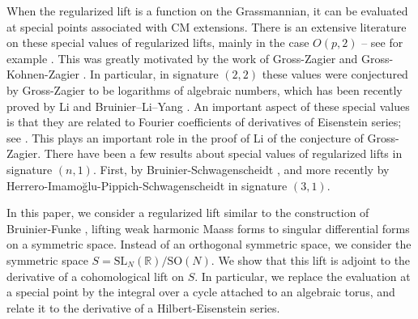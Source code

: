 \documentclass[twoside,a4paper,10pt]{article} %
\newcommand{\8}{\infty}
\newcommand{\SO}{\mathrm{SO}}
\newcommand{\SL}{\mathrm{SL}}
\newcommand{\R}{\mathbb{R}}
\theoremstyle{mytheoremstyle}
\theoremstyle{remark}
\numberwithin{equation}{section}
\begin{document}
When the regularized lift is a function on the Grassmannian, it can be evaluated at special points associated with CM extensions. There is an extensive literature on these special values of regularized lifts, mainly in the case $O(p,2)$ -- see for example \cite{Schofer,V15,BKY,BY09,BEY,E17,Li22,Li23,BLY25}. This was greatly motivated by the work of Gross-Zagier \cite{gz86} and Gross-Kohnen-Zagier \cite{GKZ87}. In particular, in signature $(2,2)$ these values were conjectured by Gross-Zagier to be logarithms of algebraic numbers, which has been recently proved by Li \cite{Li23} and Bruinier–Li–Yang \cite{BLY25}. An important aspect of these special values is that they are related to Fourier coefficients of derivatives of Eisenstein series; see \cite{BKY,BY09,BEY}. This plays an important role in the proof of Li \cite{Li23} of the conjecture of Gross-Zagier. There have been a few results about special values of regularized lifts in signature $(n,1)$. First, by Bruinier-Schwagenscheidt \cite{BS21}, and more recently by Herrero-Imamo\u{g}lu-Pippich-Schwagenscheidt \cite{HIPS24} in signature $(3,1)$.

In this paper, we consider a regularized lift similar to the construction of Bruinier-Funke \cite{BF04}, lifting weak harmonic Maass forms to singular differential forms on a symmetric space. Instead of an orthogonal symmetric space, we consider the symmetric space $S=\SL_N(\R)/\SO(N)$. %
We show that this lift is adjoint to the derivative of a cohomological lift on $S$. In particular, we replace the evaluation at a special point by the integral over a cycle attached to an algebraic torus, and relate it to the derivative of a Hilbert-Eisenstein series. 
\end{document}
